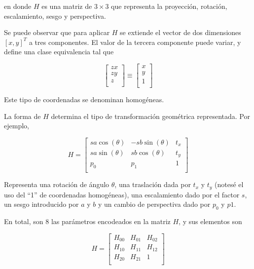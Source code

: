 \documentclass[a4paper,10pt]{article}
\begin{document}
en donde $H$ es una matriz de $3 \times 3$ que representa la proyección, rotación, escalamiento, sesgo y perspectiva.

Se puede observar que para aplicar $H$ se extiende el vector de dos dimensiones $[x,y]^{T}$ a tres componentes. El valor de la
tercera componente puede variar, y define una clase equivalencia tal que

\begin{equation}
    \begin{bmatrix}
        zx \\
        zy \\
        z \\
    \end{bmatrix}
    \equiv
    \begin{bmatrix}
        x \\
        y \\
        1 \\
    \end{bmatrix}
\end{equation}

Este tipo de coordenadas se denominan homogéneas.

La forma de $H$ determina el tipo de transformación geométrica representada. Por ejemplo,

\begin{equation}
    H =
    \begin{bmatrix}
        sa\cos(\theta) & -sb\sin(\theta) & t_{x}\\
        sa\sin(\theta) & sb\cos(\theta) & t_{y} \\
        p_{0}          & p_{1}          & 1     \\
    \end{bmatrix}
\end{equation}

Representa una rotación de ángulo $\theta$, una traslación dada por $t_{x}$ y $t_{y}$ (notesé el uso del ``1'' de coordenadas
homogéneas), una escalamiento dado por el factor $s$, un sesgo introducido por $a$ y $b$ y un cambio de perspectiva
dado por $p_{0}$ y $p{1}$.

En total, son 8 las parámetros encodeados en la matriz $H$, y sus elementos son

\begin{equation}
    H =
    \begin{bmatrix}
        H_{00} & H_{01} & H_{02}\\
        H_{10} & H_{11} & H_{12}\\
        H_{20} & H_{21} & 1\\
    \end{bmatrix}
\end{equation}
\end{document}
